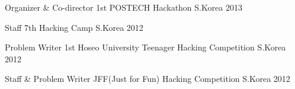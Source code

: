 


\begin{cvhonors}


\cvhonor
{Organizer \& Co-director} %
{1st POSTECH Hackathon} %
{S.Korea} %
{2013} %


\cvhonor
{Staff} %
{7th Hacking Camp} %
{S.Korea} %
{2012} %


\cvhonor
{Problem Writer} %
{1st Hoseo University Teenager Hacking Competition} %
{S.Korea} %
{2012} %


\cvhonor
{Staff \& Problem Writer} %
{JFF(Just for Fun) Hacking Competition} %
{S.Korea} %
{2012} %


\end{cvhonors}
